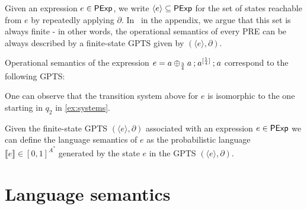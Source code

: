 Given an expression $e \in \mathsf{PExp}$, we write $\langle e\rangle \subseteq \mathsf{PExp}$ for the set of states reachable from $e$ by repeatedly applying $\partial$. In~\cite[Lemma~A.1]{preprint} in the appendix, we argue that this set is always finite - in other words, the operational semantics of every {PRE} can be always described by a finite-state {GPTS} given by $(\langle e \rangle, \partial)$.
\begin{example} Operational semantics of the expression $e = a \oplus_{\frac{3}{4}} a \mathbin{;} a^{[\frac{1}{4}]}\mathbin{;} a$ correspond to the following {GPTS}: 
\begin{center}
\end{center}
One can observe that the transition system above for $e$ is isomorphic to the one starting in $q_2$ in \cref{ex:systems}.
\end{example}

Given the finite-state {GPTS} $(\langle e \rangle, \partial)$ associated with an expression $e\in \mathsf{PExp}$ we can define the language semantics of $e$ as the probabilistic language $\llbracket e\rrbracket \in [0,1]^{A^*}$ generated by the state $e$ in the {GPTS} $(\langle e \rangle, \partial)$. 
	\section{Language semantics}

 